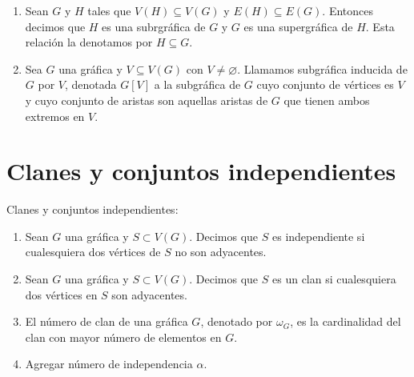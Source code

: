 \begin{definicion}
    \label{def:propiedades}
    \begin{enumerate}
        \item Sean $G$ y $H$ tales que $V(H) \subseteq V(G)$ y $E(H) \subseteq
        E(G)$. Entonces decimos que $H$ es una subrgr\'afica de $G$ y $G$ es una
        supergr\'afica de $H$. Esta relaci\'on la denotamos por $H \subseteq G$.
        \item Sea $G$ una gr\'afica y $V \subseteq V(G)$ con $V \neq
        \varnothing$. Llamamos subgr\'afica inducida de $G$ por $V$, denotada
        $G[V]$ a la subgr\'afica de $G$ cuyo conjunto de v\'ertices es $V$ y
        cuyo conjunto de aristas son aquellas aristas de $G$ que tienen ambos
        extremos en $V$.
    \end{enumerate}
\end{definicion}


\section{Clanes y conjuntos independientes}
\label{sec:clanes-CIndep}

\begin{definicion} Clanes y conjuntos independientes:
    \label{def:clanes y conjunto independiente}
    \begin{enumerate}
        \item Sean $G$ una gr\'afica y $S \subset V(G)$. Decimos que $S$ es
        independiente si cualesquiera dos v\'ertices de $S$ no son adyacentes.
        \item Sean $G$ una gr\'afica y $S \subset V(G)$. Decimos que $S$ es un
        clan si cualesquiera dos v\'ertices en $S$ son adyacentes.
        \item El n\'umero de clan de una gr\'afica $G$, denotado por $\omega_G$,
        es la cardinalidad del clan con mayor n\'umero de elementos en $G$.
        \item Agregar n\'umero de independencia $\alpha$.
    \end{enumerate}
\end{definicion}

